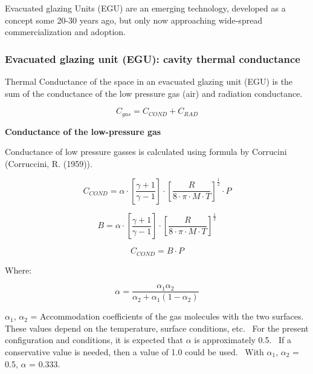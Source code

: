 Evacuated glazing Units (EGU) are an emerging technology, developed as a concept some 20-30 years ago, but only now approaching wide-spread commercialization and adoption.

\subsubsection{Evacuated glazing unit (EGU): cavity thermal conductance}\label{evacuated-glazing-unit-egu-cavity-thermal-conductance}

Thermal Conductance of the space in an evacuated glazing unit (EGU) is the sum of the conductance of the low pressure gas (air) and radiation conductance.

\begin{equation}
{C_{gas}} = {C_{COND}} + {C_{RAD}}
\end{equation}

\textbf{Conductance of the low-pressure gas}

Conductance of low pressure gasses is calculated using formula by Corrucini (Corruccini, R. (1959)).

\begin{equation}
{C_{COND}} = \alpha  \cdot \left[ {\frac{{\gamma  + 1}}{{\gamma  - 1}}} \right] \cdot {\left[ {\frac{R}{{8 \cdot \pi  \cdot M \cdot T}}} \right]^{\frac{1}{2}}} \cdot P
\end{equation}

\begin{equation}
B = \alpha  \cdot \left[ {\frac{{\gamma  + 1}}{{\gamma  - 1}}} \right] \cdot {\left[ {\frac{R}{{8 \cdot \pi  \cdot M \cdot T}}} \right]^{\frac{1}{2}}}
\end{equation}

\begin{equation}
{C_{COND}} = B \cdot P
\end{equation}

Where:

\begin{equation}
\alpha  = \frac{{{\alpha_1}{\alpha_2}}}{{{\alpha_2} + {\alpha_1}\left( {1 - {\alpha_2}} \right)}}
\end{equation}

$\alpha$\(_{1}\), $\alpha$\(_{2}\) = Accommodation coefficients of the gas molecules with the two surfaces.~ These values depend on the temperature, surface conditions, etc.~ For the present configuration and conditions, it is expected that \emph{$\alpha$} is approximately 0.5.~ If a conservative value is needed, then a value of 1.0 could be used.~ With $\alpha$\(_{1}\), $\alpha$\(_{2}\) = 0.5, $\alpha$ = 0.333.

